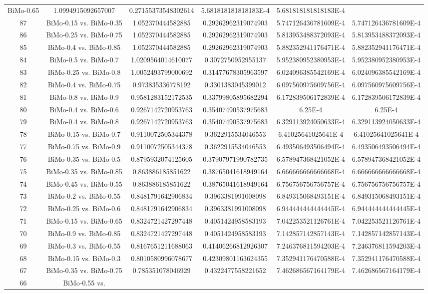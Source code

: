 \documentclass[a4paper,10pt]{article}
\begin{document}
\begin{landscape}
\begin{table}[!htp]
\begin{tabular}{cccccc}
BiMo-0.65&1.0994915092657007&0.27155373548302614&5.681818181818183E-4&5.681818181818183E-4\\87&BiMo-0.15 vs. BiMo-0.35&1.052370444582885&0.29262962319074903&5.747126436781609E-4&5.747126436781609E-4\\86&BiMo-0.25 vs. BiMo-0.75&1.052370444582885&0.29262962319074903&5.813953488372093E-4&5.813953488372093E-4\\85&BiMo-0.4 vs. BiMo-0.85&1.052370444582885&0.29262962319074903&5.882352941176471E-4&5.882352941176471E-4\\84&BiMo-0.5 vs. BiMo-0.7&1.0209564014610077&0.3072750952955137&5.952380952380953E-4&5.952380952380953E-4\\83&BiMo-0.25 vs. BiMo-0.8&1.0052493799000692&0.31477678305963597&6.024096385542169E-4&6.024096385542169E-4\\82&BiMo-0.4 vs. BiMo-0.75&0.973835336778192&0.3301383045399012&6.097560975609756E-4&6.097560975609756E-4\\81&BiMo-0.8 vs. BiMo-0.9&0.9581283152172535&0.33799805895682294&6.172839506172839E-4&6.172839506172839E-4\\80&BiMo-0.4 vs. BiMo-0.6&0.9267142720953763&0.35407490537975683&6.25E-4&6.25E-4\\79&BiMo-0.4 vs. BiMo-0.8&0.9267142720953763&0.35407490537975683&6.329113924050633E-4&6.329113924050633E-4\\78&BiMo-0.15 vs. BiMo-0.7&0.9110072505344378&0.3622915534046553&6.41025641025641E-4&6.41025641025641E-4\\77&BiMo-0.75 vs. BiMo-0.9&0.9110072505344378&0.3622915534046553&6.493506493506494E-4&6.493506493506494E-4\\76&BiMo-0.35 vs. BiMo-0.5&0.8795932074125605&0.37907971990782735&6.578947368421052E-4&6.578947368421052E-4\\75&BiMo-0.35 vs. BiMo-0.85&0.863886185851622&0.38765041618949164&6.666666666666668E-4&6.666666666666668E-4\\74&BiMo-0.45 vs. BiMo-0.55&0.863886185851622&0.38765041618949164&6.756756756756757E-4&6.756756756756757E-4\\73&BiMo-0.2 vs. BiMo-0.55&0.8481791642906834&0.3963381991008098&6.849315068493151E-4&6.849315068493151E-4\\72&BiMo-0.25 vs. BiMo-0.6&0.8481791642906834&0.3963381991008098&6.944444444444445E-4&6.944444444444445E-4\\71&BiMo-0.15 vs. BiMo-0.65&0.8324721427297448&0.4051424958583193&7.042253521126761E-4&7.042253521126761E-4\\70&BiMo-0.9 vs. BiMo-0.85&0.8324721427297448&0.4051424958583193&7.142857142857143E-4&7.142857142857143E-4\\69&BiMo-0.3 vs. BiMo-0.55&0.8167651211688063&0.41406266812926307&7.246376811594203E-4&7.246376811594203E-4\\68&BiMo-0.15 vs. BiMo-0.3&0.8010580996078677&0.42309801163624355&7.352941176470588E-4&7.352941176470588E-4\\67&BiMo-0.35 vs. BiMo-0.75&0.785351078046929&0.4322477558221652&7.462686567164179E-4&7.462686567164179E-4\\66&BiMo-0.55 vs. 
\end{tabular}
\end{table}
\end{landscape}
\end{document}
